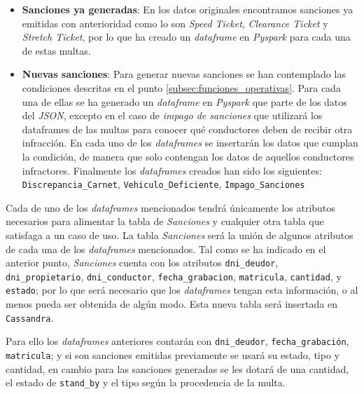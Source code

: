 \documentclass[]{article}
\begin{document}
\begin{itemize}
    \item \textbf{Sanciones ya generadas}: En los datos originales encontramos
    sanciones ya emitidas con anterioridad como lo son \textit{Speed Ticket},
    \textit{Clearance Ticket} y \textit{Stretch Ticket}, por lo que ha creado
    un \textit{dataframe} en \textit{Pyspark} para cada una de estas multas.

    \item \textbf{Nuevas sanciones}: Para generar nuevas sanciones se han
    contemplado las condiciones descritas en el punto \ref{subsec:funciones_operativas}.
    Para cada una de
    ellas se ha generado un \textit{dataframe} en \textit{Pyspark} que parte de
    los datos del \textit{JSON}, excepto en el caso de \textit{impago de
    sanciones} que utilizará los dataframes de las multas para conocer qué
    conductores deben de recibir otra infracción. En cada uno de los
    \textit{dataframes} se insertarán los datos que cumplan la condición, de
    manera que solo contengan los datos de aquellos conductores infractores.
    Finalmente los \textit{dataframes} creados han sido los siguientes:
    \texttt{Discrepancia\_Carnet}, \texttt{Vehiculo\_Deficiente},
    \texttt{Impago\_Sanciones}
\end{itemize}

Cada de uno de los \textit{dataframes} mencionados tendrá únicamente los
atributos necesarios para alimentar la tabla de \textit{Sanciones} y cualquier
otra tabla que satisfaga a un caso de uso.
La tabla \textit{Sanciones} será la unión de algunos atributos de cada una de
los \textit{dataframes} mencionados. Tal como se ha indicado en el anterior
punto, \textit{Sanciones} cuenta con los atributos \texttt{dni\_deudor},
\texttt{dni\_propietario}, \verb!dni_conductor!, \verb!fecha_grabacion!,
\verb!matricula!, \verb!cantidad!, y \verb!estado!; por lo que será necesario que los \textit{dataframes} tengan esta
información, o al menos pueda ser obtenida de algún modo. Esta nueva tabla será
insertada en \texttt{Cassandra}.

Para ello los \textit{dataframes} anteriores contarán con \texttt{dni\_deudor}, \texttt{fecha\_grabación}, \texttt{matricula}; y si son sanciones emitidas previamente se usará su estado, tipo y cantidad, en cambio para las sanciones generadas se les dotará de una cantidad, el estado de \texttt{stand\_by} y el tipo según la procedencia de la multa.
\end{document}
